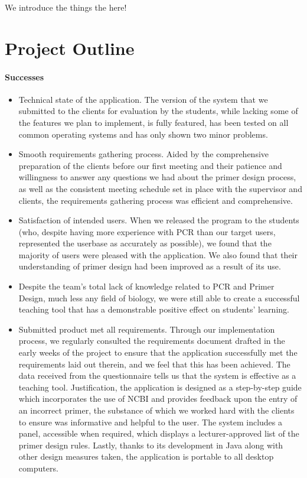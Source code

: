 We introduce the things the here!

\section{Project Outline}
\paragraph{Successes}
\begin{itemize}
\item Technical state of the application. The version of the system that
  we submitted to the clients for evaluation by the students, while lacking
  some of the features we plan to implement, is fully featured, has been
  tested on all common operating systems and has only shown two minor problems.
  
\item Smooth requirements gathering process. Aided by the comprehensive
  preparation of the clients before our first meeting and their patience and
  willingness to answer any questions we had about the primer design process,
  as well as the consistent meeting schedule set in place with the supervisor
  and clients, the requirements gathering process was efficient and comprehensive.

\item Satisfaction of intended users. When we released the program to the
  students (who, despite having more experience with PCR than our target users,
  represented the userbase as accurately as possible),
  we found that the majority of users were pleased with the application. We also
  found that their understanding of primer design had been improved as a result
  of its use.

\item Despite the team's total lack of knowledge related to PCR and Primer Design,
  much less any field of biology, we were still able to create a successful teaching
  tool that has a demonstrable positive effect on students' learning. 

\item Submitted product met all requirements. Through our implementation process, we
  regularly consulted the requirements document drafted in the early weeks of the
  project to ensure that the application successfully met the requirements laid out
  therein, and we feel that this has been achieved. The data received from the
  questionnaire tells us that the system is effective as a teaching tool. 
  Justification, the application is designed as a step-by-step guide which incorporates
  the use of NCBI and provides feedback upon the entry of an incorrect primer,
  the substance of which we worked hard with the clients to ensure was informative
  and helpful to the user. The system includes a panel, accessible when required,
  which displays a lecturer-approved list of the primer design rules. 
  Lastly, thanks to its development in Java along with other design measures taken,
  the application is portable to all desktop computers.
\end{itemize}

